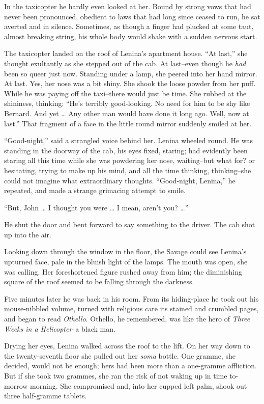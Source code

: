 \documentclass[12pt]{report}
\begin{document}
In the taxicopter he hardly even looked at her. Bound by strong vows
that had never been pronounced, obedient to laws that had long since
ceased to run, he sat averted and in silence. Sometimes, as though a
finger had plucked at some taut, almost breaking string, his whole body
would shake with a sudden nervous start.

The taxicopter landed on the roof of Lenina's apartment house. ``At
last,'' she thought exultantly as she stepped out of the cab. At
last--even though he \emph{had} been so queer just now. Standing under a
lamp, she peered into her hand mirror. At last. Yes, her nose was a bit
shiny. She shook the loose powder from her puff. While he was paying off
the taxi--there would just be time. She rubbed at the shininess,
thinking: ``He's terribly good-looking. No need for him to be shy like
Bernard. And yet \ldots{} Any other man would have done it long ago.
Well, now at last.'' That fragment of a face in the little round mirror
suddenly smiled at her.

``Good-night,'' said a strangled voice behind her. Lenina wheeled round.
He was standing in the doorway of the cab, his eyes fixed, staring; had
evidently been staring all this time while she was powdering her nose,
waiting--but what for? or hesitating, trying to make up his mind, and
all the time thinking, thinking--she could not imagine what
extraordinary thoughts. ``Good-night, Lenina,'' he repeated, and made a
strange grimacing attempt to smile.

``But, John \ldots{} I thought you were \ldots{} I mean, aren't you?
\ldots{}''

He shut the door and bent forward to say something to the driver. The
cab shot up into the air.

Looking down through the window in the floor, the Savage could see
Lenina's upturned face, pale in the bluish light of the lamps. The mouth
was open, she was calling. Her foreshortened figure rushed away from
him; the diminishing square of the roof seemed to be falling through the
darkness.

Five minutes later he was back in his room. From its hiding-place he
took out his mouse-nibbled volume, turned with religious care its
stained and crumbled pages, and began to read \emph{Othello}. Othello,
he remembered, was like the hero of \emph{Three Weeks in a
Helicopter}--a black man.

Drying her eyes, Lenina walked across the roof to the lift. On her way
down to the twenty-seventh floor she pulled out her \emph{soma} bottle.
One gramme, she decided, would not be enough; hers had been more than a
one-gramme affliction. But if she took two grammes, she ran the risk of
not waking up in time to-morrow morning. She compromised and, into her
cupped left palm, shook out three half-gramme tablets.
\end{document}
